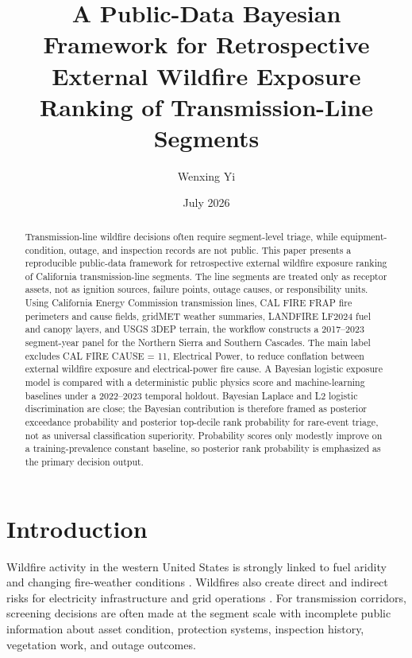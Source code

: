 \documentclass[11pt]{article}
\title{A Public-Data Bayesian Framework for Retrospective External Wildfire Exposure Ranking of Transmission-Line Segments}
\author{Wenxing Yi}
\date{July 2026}
\begin{document}
\maketitle

\begin{abstract}
Transmission-line wildfire decisions often require segment-level triage, while
equipment-condition, outage, and inspection records are not public. This paper
presents a reproducible public-data framework for retrospective external
wildfire exposure ranking of California transmission-line segments. The line
segments are treated only as receptor assets, not as ignition sources, failure
points, outage causes, or responsibility units. Using California Energy
Commission transmission lines, CAL FIRE FRAP fire perimeters and cause fields,
gridMET weather summaries, LANDFIRE LF2024 fuel and canopy layers, and USGS
3DEP terrain, the workflow constructs a 2017--2023 segment-year panel for the
Northern Sierra and Southern Cascades. The main label excludes CAL FIRE CAUSE =
11, Electrical Power, to reduce conflation between external wildfire exposure
and electrical-power fire cause. A Bayesian logistic exposure model is compared
with a deterministic public physics score and machine-learning baselines under
a 2022--2023 temporal holdout. Bayesian Laplace and L2 logistic discrimination
are close; the Bayesian contribution is therefore framed as posterior
exceedance probability and posterior top-decile rank probability for rare-event
triage, not as universal classification superiority. Probability scores only
modestly improve on a training-prevalence constant baseline, so posterior rank
probability is emphasized as the primary decision output.
\end{abstract}

\section{Introduction}

Wildfire activity in the western United States is strongly linked to fuel
aridity and changing fire-weather conditions
\citep{abatzoglouWilliams2016wildfire}. Wildfires also create direct and
indirect risks for electricity infrastructure and grid operations
\citep{dale2018californiaGrid,panossianElgindy2023wildfire}. For transmission
corridors, screening decisions are often made at the segment scale with
incomplete public information about asset condition, protection systems,
inspection history, vegetation work, and outage outcomes.
\end{document}
